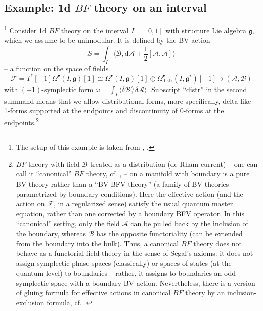 \documentclass{amsart}
\theoremstyle{plain} %
\theoremstyle{definition}
\newtheorem{expl}[thm]{Example}
\theoremstyle{remark}
\newcommand{\g}{\mathfrak{g}}
\newcommand{\mc}{\mathcal}
\newcommand{\mr}{\mathrm}
\newcommand{\bt}{\bullet}
\newcommand{\bl}{\color{blue}}
\newcommand{\F}{\mathcal{F}}
\newcommand{\dr}{\mathrm{d}}
\begin{document}
\subsection{Example: 1d $BF$ theory on an interval}\!\!\!\footnote{The setup of this example is taken from \cite{simpBF}, \cite{discrBF}.}
\label{sss: 1d BF on an interval}
Consider 1d $BF$ theory on the interval $I=[0,1]$ with structure Lie algebra $\g$, which we assume to be unimodular.
It is defined by the BV action 
\begin{equation}\label{1d BF action}
S=\int_I \langle \mc{B},\dr \mc{A}+\frac12[\mc{A},\mc{A}] \rangle\end{equation} 
-- a function on the space of fields 
\begin{equation}\label{1d BF space of fields}
\F=T^*[-1] \Omega^\bt(I,\g)[1]\cong \Omega^\bt(I,\g)[1]\oplus \Omega^\bt_\mr{distr}(I,\g^*)[-1]\ni (\mc{A},\mc{B})
\end{equation}
with $(-1)$-symplectic form $\omega=\int_I \langle \delta \mc{B}\stackrel{\wedge}{,} \delta\mc{A}\rangle $. Subscript ``distr'' in the second summand means that we allow distributional forms, more specifically, delta-like 1-forms supported at the endpoints and discontinuity of 0-forms at the endpoints.\footnote{
$BF$ theory with field $\mc{B}$ treated as a distribution (de Rham current) -- one can call it ``canonical'' $BF$ theory, cf. \cite{discrBF}, \cite[Section 6.3]{CR} -- on a manifold with boundary is a pure BV theory rather than a ``BV-BFV theory'' \cite{CMRpert} (a family of BV theories parametrized by boundary conditions). Here the effective action (and the action on $\mc{F}$, in a regularized sense) satisfy the usual quantum master equation, rather than one corrected by a boundary BFV operator. In this ``canonical'' setting, only the field $\mc{A}$ can be pulled back by the inclusion of the boundary, whereas $\mc{B}$ has the opposite functoriality (can be extended from the boundary into the bulk). Thus, a canonical $BF$ theory does not behave as a functorial field theory in the sense of Segal's axioms: it does not assign symplectic phase spaces (classically) or spaces of states (at the quantum level) to boundaries -- rather, it assigns to boundaries an odd-symplectic space with a boundary BV action. Nevertheless, there is a version of gluing formula for effective actions in canonical $BF$ theory by an inclusion-exclusion formula, cf. \cite[Section 5.4]{discrBF}.
}
\end{document}
